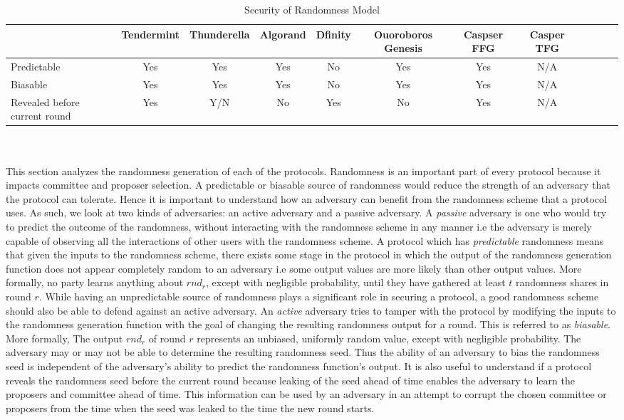 \documentclass[10pt,journal,compsoc]{IEEEtran}
\begin{document}
\begin{table*}[htp]
 \caption{Security of Randomness Model}
\label{}
\begin{tabularx}{\textwidth}{@{}l*{10}{c}c@{}}
\toprule
                 & Tendermint & Thunderella & Algorand & Dfinity & Ouoroboros Genesis  & Caspser FFG & Casper TFG   \\ 
\midrule
Predictable    & Yes  &  Yes & Yes   & No & Yes & Yes & N/A   \\
\addlinespace
Biasable & Yes   & Yes  & Yes & No & Yes & Yes & N/A \\ 
\addlinespace
Revealed before current round & Yes  & Y/N  & No & Yes & No & Yes & N/A\\ 
\bottomrule
\end{tabularx}
\end{table*}
\\\\
This section analyzes the randomness generation of each of the protocols. Randomness is an important part of every protocol because it impacts committee and proposer selection. A predictable or biasable source of randomness would reduce the strength of an adversary that the protocol can tolerate. Hence it is important to understand how an adversary can benefit from the randomness scheme that a protocol uses. As such, we look at two kinds of adversaries: an active adversary and a passive adversary\cite{Mahnush}. A \emph{passive} adversary is one who would try to predict the outcome of the randomness, without interacting with the randomness scheme in any manner i.e the adversary is merely capable of observing all the interactions of other users with the randomness scheme. A protocol which has \emph{predictable} randomness means that given the inputs to the randomness scheme, there exists some stage in the protocol in which the output of the randomness generation function does not appear completely random to an adversary i.e some output values are more likely than other output values. More formally, no party learns anything about $rnd_r$, except with negligible probability, until they have gathered at least $t$ randomness shares in round $r$. While having an unpredictable source of randomness plays a significant role in securing a protocol, a good randomness scheme should also be able to defend against an active adversary. An \emph{active} adversary tries to tamper with the protocol by modifying the inputs to the randomness generation function with the goal of changing the resulting randomness output for a round. This is referred to as \emph{biasable}. More formally,  The output $rnd_r$ of round $r$ represents an unbiased, uniformly random value, except with negligible probability. The adversary may or may not be able to determine the resulting randomness seed. Thus the ability of an adversary to bias the randomness seed is independent of the adversary's ability to predict the randomness function's output. It is also useful to understand if a protocol reveals the randomness seed before the current round because leaking of the seed ahead of time enables the adversary to learn the proposers and committee ahead of time. This information can be used by an adversary in an attempt to corrupt the chosen committee or proposers from the time when the seed was leaked to the time the new round starts.
\end{document}
